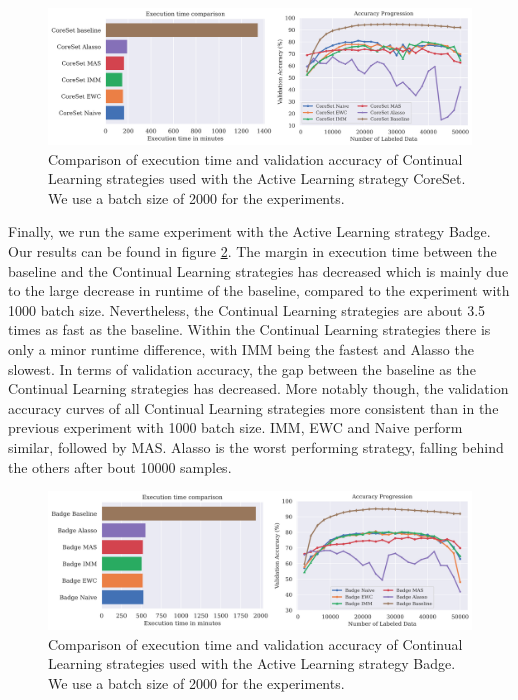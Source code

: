 \begin{figure}[h]
    \centering
    \includegraphics[width=\linewidth]{images/results_CAL/CoreSet_CAL_2000b.png}
    \caption[Continual Active Learning CoreSet 2000 batch size]{Comparison of execution time and validation accuracy of Continual Learning strategies used with the Active Learning strategy
    CoreSet. We use a batch size of 2000 for the experiments.}
    \label{fig:Evaluation:Results:CAL:CoreSet2000}
\end{figure}

Finally, we run the same experiment with the Active Learning strategy Badge. Our results can be found in figure \ref{fig:Evaluation:Results:CAL:Badge2000}. The margin in execution time between the baseline
and the Continual Learning strategies has decreased which is mainly due to the large decrease in runtime of the baseline, compared to the experiment with 1000 batch size. Nevertheless, the Continual
Learning strategies are about 3.5 times as fast as the baseline. Within the Continual Learning strategies there is only a minor runtime difference, with IMM being the fastest and Alasso the slowest. In terms of 
validation accuracy, the gap between the baseline as the Continual Learning strategies has decreased. More notably though, the validation accuracy curves of all Continual Learning strategies more consistent than
in the previous experiment with 1000 batch size. IMM, EWC and Naive perform similar, followed by MAS. Alasso is the worst performing strategy, falling behind the others after bout 10000 samples. \par

\begin{figure}[h]
    \centering
    \includegraphics[width=\linewidth]{images/results_CAL/Badge_CAL_2000b.png}
    \caption[Continual Active Learning Badge 2000 batch size]{Comparison of execution time and validation accuracy of Continual Learning strategies used with the Active Learning strategy
    Badge. We use a batch size of 2000 for the experiments.}
    \label{fig:Evaluation:Results:CAL:Badge2000}
\end{figure}

